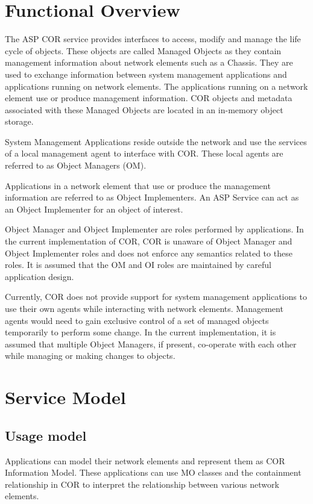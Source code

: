 \hypertarget{group__group13}{
\chapter{Functional Overview}
\label{group__group13}
}

\begin{flushleft}
The ASP COR service provides interfaces to access, modify and manage the life cycle of objects. These objects are called Managed Objects as they contain 
management information about network elements such as a Chassis. They are used to exchange information between system management 
applications and applications running on network elements. The applications running on a network element use or produce management information.
COR objects and metadata associated with these Managed Objects are located in an in-memory object storage.  
\par
System Management Applications reside outside the network and use the services of a local management agent to interface with COR. These local agents are
referred to as Object Managers (OM).
\par
Applications in a network element that use or produce the management information are referred to as Object Implementers.
An ASP Service can act as an Object Implementer for an object of interest.
\par
Object Manager and Object Implementer are roles performed by applications. In the current implementation of COR, COR is unaware of Object 
Manager and Object Implementer roles and does not enforce any semantics related to these roles. It is assumed that the OM and OI roles
are maintained by careful application design.        
\par
Currently, COR does not provide support for system management applications to use their own agents while interacting with network elements.
Management agents would need to gain exclusive control of a set of managed objects temporarily to perform some change. In the current implementation, it 
is assumed that multiple Object Managers, if present, co-operate with each other while managing or making changes to objects.

\chapter{Service Model}
\section{Usage model}
Applications can model their network elements and represent them as COR Information Model. These applications can use MO classes and the 
containment relationship in COR to interpret the relationship between various network elements.


\end{flushleft}

